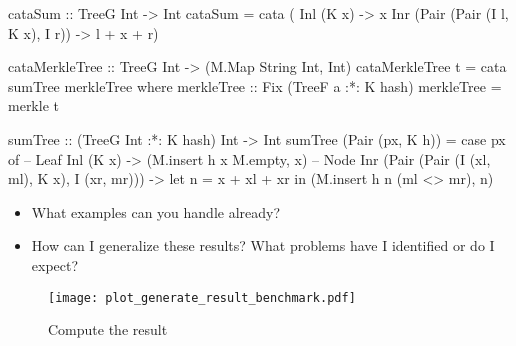 \begin{haskell}
cataSum :: TreeG Int -> Int
cataSum = cata (\case
  Inl (K x)                         -> x         
  Inr (Pair (Pair (I l, K x), I r)) -> l + x + r)
\end{haskell}

\begin{haskell}
cataMerkleTree :: TreeG Int -> (M.Map String Int, Int)
cataMerkleTree t = cata sumTree merkleTree
  where
    merkleTree :: Fix (TreeF a :*: K hash)
    merkleTree = merkle t

    sumTree :: (TreeG Int :*: K hash) Int -> Int
    sumTree (Pair (px, K h)) = case px of
      -- Leaf  
      Inl (K x)                       
        -> (M.insert h x M.empty, x) 
      -- Node
      Inr (Pair (Pair (I (xl, ml), K x), I (xr, mr))) 
        -> let n = x + xl + xr 
           in (M.insert h n (ml <> mr), n) 
\end{haskell}

\begin{itemize}
  \item What examples can you handle already?
  \item How can I generalize these results? What problems have I identified or do I expect?
\end{itemize}

\begin{figure}[H]
  \centering

  \texttt{[image: plot\_generate\_result\_benchmark.pdf]}
  \caption{Compute the result}
  \label{fig-compute-result}
\end{figure}
